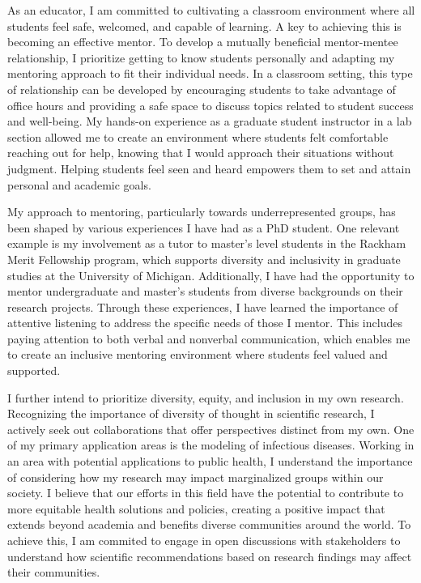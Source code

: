 \documentclass[11pt]{article}
\begin{document}
As an educator, I am committed to cultivating a classroom environment where all students feel safe, welcomed, and capable of learning.
A key to achieving this is becoming an effective mentor.
To develop a mutually beneficial mentor-mentee relationship, I prioritize getting to know students personally and adapting my mentoring approach to fit their individual needs.
In a classroom setting, this type of relationship can be developed by encouraging students to take advantage of office hours and providing a safe space to discuss topics related to student success and well-being.
My hands-on experience as a graduate student instructor in a lab section allowed me to create an environment where students felt comfortable reaching out for help, knowing that I would approach their situations without judgment.
Helping students feel seen and heard empowers them to set and attain personal and academic goals.

My approach to mentoring, particularly towards underrepresented groups, has been shaped by various experiences I have had as a PhD student.
One relevant example is my involvement as a tutor to master's level students in the Rackham Merit Fellowship program, which supports diversity and inclusivity in graduate studies at the University of Michigan.
Additionally, I have had the opportunity to mentor undergraduate and master's students from diverse backgrounds on their research projects.
Through these experiences, I have learned the importance of attentive listening to address the specific needs of those I mentor.
This includes paying attention to both verbal and nonverbal communication, which enables me to create an inclusive mentoring environment where students feel valued and supported.

I further intend to prioritize diversity, equity, and inclusion in my own research.
Recognizing the importance of diversity of thought in scientific research, I actively seek out collaborations that offer perspectives distinct from my own.
One of my primary application areas is the modeling of infectious diseases.
Working in an area with potential applications to public health, I understand the importance of considering how my research may impact marginalized groups within our society.
I believe that our efforts in this field have the potential to contribute to more equitable health solutions and policies, creating a positive impact that extends beyond academia and benefits diverse communities around the world.
To achieve this, I am commited to engage in open discussions with stakeholders to understand how scientific recommendations based on research findings may affect their communities.
\end{document}
